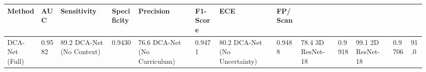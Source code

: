 \begin{tabular}{llllllll}
\toprule
Method & AUC & Sensitivity & Specificity & Precision & F1-Score & ECE & FP/Scan \\
\midrule
DCA-Net (Full) & 0.9582 & 89.2%
DCA-Net (No Context) & 0.9430 & 76.6%
DCA-Net (No Curriculum) & 0.9471 & 80.2%
DCA-Net (No Uncertainty) & 0.9488 & 78.4%
3D ResNet-18 & 0.9918 & 99.1%
2D ResNet-18 & 0.9706 & 91.0%
\bottomrule
\end{tabular}
